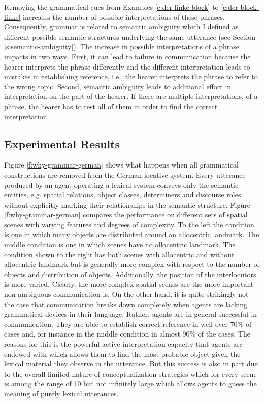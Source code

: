 Removing the grammatical cues from 
Examples \ref{e:der-linke-block} to \ref{e:der-block-links}
increases the number of possible interpretations of these phrases.
Consequently, grammar is related to semantic 
ambiguity which I defined as different possible semantic structures underlying the 
same utterance (see Section \ref{s:semantic-ambiguity}). 
The increase in possible interpretations of a phrase
impacts in two ways. First, it can lead to failure in communication 
because the hearer interprets the phrase differently and the different 
interpretation leads to mistakes in 
establishing reference, i.e., the hearer interprets the phrase to refer to the wrong
topic. Second, semantic ambiguity leads to additional 
effort in interpretation on the part of the hearer. If there are multiple interpretations, of 
a phrase, the hearer has to test all of them in order to find the correct interpretation.

\subsection{Experimental Results}
Figure \ref{f:why-grammar-german} shows what happens when all 
grammatical constructions are removed from the German locative 
system. Every utterance produced by an agent operating a lexical 
system conveys only the semantic entities, e.g. spatial relations, 
object classes, determiners and discourse roles without explicitly 
marking their relationships in the semantic structure. Figure 
\ref{f:why-grammar-german} compares the performance on different 
sets of spatial scenes with varying features and degrees of complexity. 
To the left the condition is one in which many objects are distributed 
around an allocentric landmark. The middle condition is one in which 
scenes have no allocentric landmark. The condition 
shown to the right has both scenes with allocentric and 
without allocentric landmark but is generally more complex with 
respect to the number of objects and distribution of objects. 
Additionally, the position of the interlocutors is more varied. Clearly, the more complex 
spatial scenes are the more important non-ambiguous communication is. On the other hand, 
it is quite strikingly not the case that communication breaks down completely when agents are lacking grammatical devices in their language. Rather, agents are in general successful in communication. 
They are able to establish correct reference in well over 70\% of cases and, for instance in the middle condition in almost 90\% of the cases. 
The reasons for this is the powerful active interpretation capacity that agents are
endowed with which allows them to find the most probable object given the 
lexical material they observe in the utterance. But this success is also in part 
due to the overall limited nature of conceptualization strategies which for every 
scene is among the range of 10 but not infinitely large which allows agents to guess 
the meaning of purely lexical utterances.


